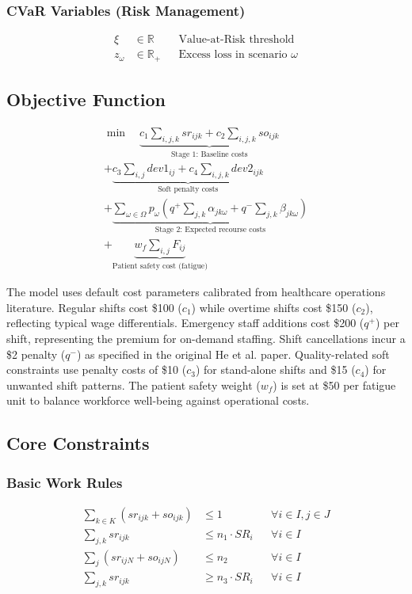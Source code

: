 \documentclass[11pt,letterpaper]{article}
\begin{document}
\subsubsection{CVaR Variables (Risk Management)}
\begin{align*}
\xi &\in \mathbb{R} && \text{Value-at-Risk threshold} \\
z_\omega &\in \mathbb{R}_+ && \text{Excess loss in scenario $\omega$}
\end{align*}

\subsection{Objective Function}
\begin{multline}
\min \quad \underbrace{c_1 \sum_{i,j,k} sr_{ijk} + c_2 \sum_{i,j,k} so_{ijk}}_{\text{Stage 1: Baseline costs}} \\
+ \underbrace{c_3 \sum_{i,j} dev1_{ij} + c_4 \sum_{i,j,k} dev2_{ijk}}_{\text{Soft penalty costs}} \\
+ \underbrace{\sum_{\omega \in \Omega} p_\omega \left( q^+ \sum_{j,k} \alpha_{jk\omega} + q^- \sum_{j,k} \beta_{jk\omega} \right)}_{\text{Stage 2: Expected recourse costs}} \\
+ \underbrace{w_f \sum_{i,j} F_{ij}}_{\text{Patient safety cost (fatigue)}}
\end{multline}

The model uses default cost parameters calibrated from healthcare operations literature. Regular shifts cost \$100 ($c_1$) while overtime shifts cost \$150 ($c_2$), reflecting typical wage differentials. Emergency staff additions cost \$200 ($q^+$) per shift, representing the premium for on-demand staffing. Shift cancellations incur a \$2 penalty ($q^-$) as specified in the original He et al. paper. Quality-related soft constraints use penalty costs of \$10 ($c_3$) for stand-alone shifts and \$15 ($c_4$) for unwanted shift patterns. The patient safety weight ($w_f$) is set at \$50 per fatigue unit to balance workforce well-being against operational costs.

\subsection{Core Constraints}

\subsubsection{Basic Work Rules}
\begin{align}
\sum_{k \in K} (sr_{ijk} + so_{ijk}) &\leq 1 && \forall i \in I, j \in J \tag{C1: One shift per day} \\
\sum_{j,k} sr_{ijk} &\leq n_1 \cdot SR_i && \forall i \in I \tag{C6: Max total shifts} \\
\sum_{j} (sr_{ijN} + so_{ijN}) &\leq n_2 && \forall i \in I \tag{C7: Max night shifts} \\
\sum_{j,k} sr_{ijk} &\geq n_3 \cdot SR_i && \forall i \in I \tag{C8: Min regular shifts if working}
\end{align}
\end{document}
